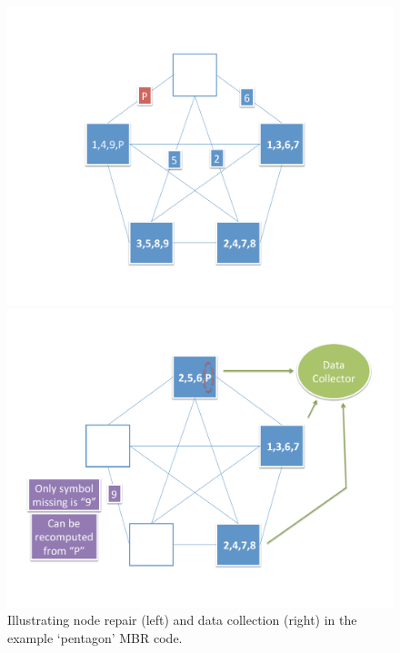 \begin{figure}[!h]
\centering
\begin{minipage}[t]{0.38\textwidth}
     \includegraphics[scale=.35]{src/Figures/chap4/pentagon_7} 
\end{minipage}
\hspace*{0.15in}
\begin{minipage}[t]{0.38\textwidth}
     \includegraphics[scale=.35]{src/Figures/chap4/pentagon_12}  
\end{minipage}
\caption{Illustrating node repair (left) and data collection (right) in the example `pentagon' MBR code.} \label{fig:pentagon_712} 
\end{figure}


